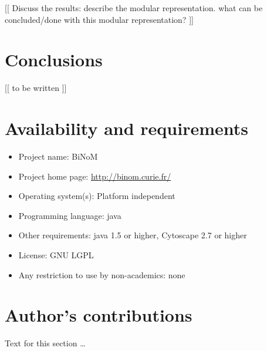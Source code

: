 \documentclass[10pt]{bmc_article}
\newenvironment{bmcformat}{\baselineskip20pt\sloppy\setboolean{publ}{false}}{\baselineskip20pt\sloppy}
\begin{document}
\begin{bmcformat}
[[ Discuss the results: describe the modular representation. what can be concluded/done with this modular representation? ]]


\section*{Conclusions}

[[ to be written ]]



\section*{Availability and requirements}

\begin{itemize}
\item Project name: BiNoM
\item Project home page: \url{http://binom.curie.fr/}
\item Operating system(s): Platform independent
\item Programming language: java
\item Other requirements: java 1.5 or higher, Cytoscape 2.7 or higher
\item License: GNU LGPL
\item Any restriction to use by non-academics: none
\end{itemize}





\bigskip

\section*{Author's contributions}
    Text for this section \ldots


\end{bmcformat}
\end{document}
